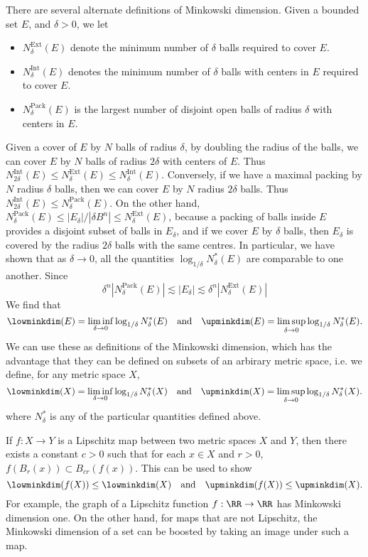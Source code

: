 There are several alternate definitions of Minkowski dimension. Given a bounded set $E$, and $\delta > 0$, we let
%
\begin{itemize}
	\item $N^\text{Ext}_\delta(E)$ denote the minimum number of $\delta$ balls required to cover $E$.
	\item $N^\text{Int}_\delta(E)$ denotes the minimum number of $\delta$ balls with centers in $E$ required to cover $E$.
	\item $N^\text{Pack}_\delta(E)$ is the largest number of disjoint open balls of radius $\delta$ with centers in $E$.
\end{itemize}
%
Given a cover of $E$ by $N$ balls of radius $\delta$, by doubling the radius of the balls, we can cover $E$ by $N$ balls of radius $2\delta$ with centers of $E$. Thus $N^\text{Int}_{2\delta}(E) \leq N^\text{Ext}_\delta(E) \leq N^{\text{Int}}_\delta(E)$. Conversely, if we have a maximal packing by $N$ radius $\delta$ balls, then we can cover $E$ by $N$ radius $2\delta$ balls. Thus $N^\text{Int}_{2\delta}(E) \leq N^\text{Pack}_\delta(E)$. On the other hand, $N^\text{Pack}_\delta(E) \leq |E_\delta|/|\delta B^n| \leq N_\delta^\text{Ext}(E)$, because a packing of balls inside $E$ provides a disjoint subset of balls in $E_\delta$, and if we cover $E$ by $\delta$ balls, then $E_\delta$ is covered by the radius $2\delta$ balls with the same centres. In particular, we have shown that as $\delta \to 0$, all the quantities $\log_{1/\delta} N^*_\delta(E)$ are comparable to one another. Since
%
\[ \delta^n |N_\delta^{\text{Pack}}(E)| \lesssim |E_\delta| \lesssim \delta^n |N_\delta^{\text{Ext}}(E)| \]
%
We find that
%
\[ \lowminkdim(E) = \liminf_{\delta \to 0} \log_{1/\delta} N_\delta^*(E) \quad\text{and}\quad \upminkdim(E) = \limsup_{\delta \to 0} \log_{1/\delta} N_\delta^*(E). \]
%
We can use these as definitions of the Minkowski dimension, which has the advantage that they can be defined on subsets of an arbirary metric space, i.e. we define, for any metric space $X$,
%
\[ \lowminkdim(X) = \liminf_{\delta \to 0} \log_{1/\delta} N_\delta^*(X) \quad\text{and}\quad \upminkdim(X) = \limsup_{\delta \to 0} \log_{1/\delta} N_\delta^*(X). \]
%
where $N^*_\delta$ is any of the particular quantities defined above.

If $f: X \to Y$ is a Lipschitz map between two metric spaces $X$ and $Y$, then there exists a constant $c > 0$ such that for each $x \in X$ and $r > 0$, $f(B_r(x)) \subset B_{cr}(f(x))$. This can be used to show
%
\[ \lowminkdim(f(X)) \leq \lowminkdim(X) \quad\text{and}\quad \upminkdim(f(X)) \leq \upminkdim(X). \]
%
For example, the graph of a Lipschitz function $f: \RR \to \RR$ has Minkowski dimension one. On the other hand, for maps that are not Lipschitz, the Minkowski dimension of a set can be boosted by taking an image under such a map.

